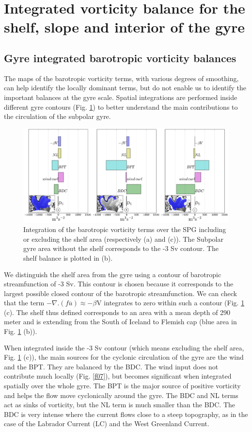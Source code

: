 \documentclass[os, manuscript]{copernicus}
\begin{document}
\section{Integrated vorticity balance for the shelf, slope and interior of the gyre}
\subsection{Gyre integrated barotropic vorticity balances}

The maps of the barotropic vorticity terms, with various degrees of smoothing, can help identify the locally dominant terms, but do not enable us to identify the important balances at the gyre scale. Spatial integrations are performed inside different gyre contours (Fig. \ref{f09}) to better understand the main contributions to the circulation of the subpolar gyre. 

\begin{figure}[t]
\includegraphics[width=14cm]{../fig_os/f09.pdf}
\caption{Integration of the barotropic vorticity terms over the SPG including or excluding the shelf area (respectively (a) and (c)). The Subpolar gyre area without the shelf corresponds to the -3 Sv contour. The shelf balance is plotted in (b).}
\label{f09}
\end{figure} 

We distinguish the shelf area from the gyre using a contour of barotropic streamfunction of -3 Sv. This contour is chosen because it corresponds to the largest possible closed contour of the barotropic streamfunction. We can check that the term $-\nabla.(f\overline{u}) \approx -\beta$V integrates to zero within such a contour (Fig. \ref{f09} (c). The shelf thus defined corresponds to an area with a mean depth of 290 meter and is extending from the South of Iceland to Flemish cap (blue area in Fig. \ref{f09} (b)).

When integrated inside the -3 Sv contour (which means excluding the shelf area, Fig. \ref{f09} (c)), the main sources for the cyclonic circulation of the gyre are the wind and the BPT. They are balanced by the BDC. The wind input does not contribute much locally (Fig. \ref{f07}), but becomes significant when integrated spatially over the whole gyre. The BPT is the major source of positive vorticity and helps the flow move cyclonically around the gyre. The BDC and NL terms act as sinks of vorticity, but the NL term is much smaller than the BDC. The BDC is very intense where the current flows close to a steep topography, as in the case of the Labrador Current (LC) and the West Greenland Current. 
\end{document}
